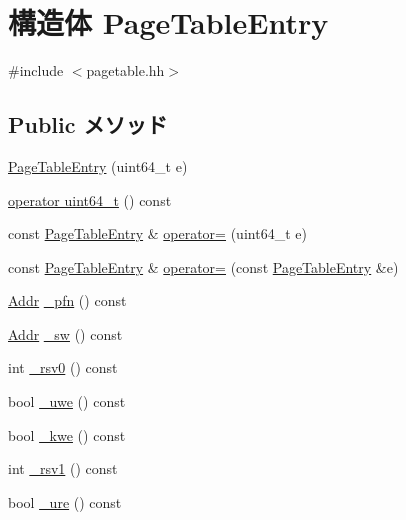 \hypertarget{structAlphaISA_1_1PageTableEntry}{
\section{構造体 PageTableEntry}
\label{structAlphaISA_1_1PageTableEntry}
}


{\ttfamily \#include $<$pagetable.hh$>$}\subsection*{Public メソッド}
\begin{DoxyCompactItemize}
\item 
\hyperlink{structAlphaISA_1_1PageTableEntry_a9b78564edbdf997072d03154bcbe97b6}{PageTableEntry} (uint64\_\-t e)
\item 
\hyperlink{structAlphaISA_1_1PageTableEntry_a6b0df69d39b0e944a8337f52c840be2d}{operator uint64\_\-t} () const 
\item 
const \hyperlink{structAlphaISA_1_1PageTableEntry}{PageTableEntry} \& \hyperlink{structAlphaISA_1_1PageTableEntry_aa0ab0fbd3211d9dbc19476a3f0bb0ab8}{operator=} (uint64\_\-t e)
\item 
const \hyperlink{structAlphaISA_1_1PageTableEntry}{PageTableEntry} \& \hyperlink{structAlphaISA_1_1PageTableEntry_a3dc2db6c9f4ed3f6e9a5b199307a78e0}{operator=} (const \hyperlink{structAlphaISA_1_1PageTableEntry}{PageTableEntry} \&e)
\item 
\hyperlink{classm5_1_1params_1_1Addr}{Addr} \hyperlink{structAlphaISA_1_1PageTableEntry_a5a30d622eca4ff3de1d213cd4f6e5cfd}{\_\-pfn} () const 
\item 
\hyperlink{classm5_1_1params_1_1Addr}{Addr} \hyperlink{structAlphaISA_1_1PageTableEntry_ae0af54e10ca4b07a9afb66b3211d88d2}{\_\-sw} () const 
\item 
int \hyperlink{structAlphaISA_1_1PageTableEntry_a6b35d93b7a6be0c385f9417d53e27266}{\_\-rsv0} () const 
\item 
bool \hyperlink{structAlphaISA_1_1PageTableEntry_a7c7589f98d14a3d99a6f9ef394c378f1}{\_\-uwe} () const 
\item 
bool \hyperlink{structAlphaISA_1_1PageTableEntry_a0be5668cbc16499f2e4c5a25601b418b}{\_\-kwe} () const 
\item 
int \hyperlink{structAlphaISA_1_1PageTableEntry_a830c54fc6920e1b76baf89149950e0a0}{\_\-rsv1} () const 
\item 
bool \hyperlink{structAlphaISA_1_1PageTableEntry_a6c829f9f6ef8d642a3cfee1dbe5d6b07}{\_\-ure} () const 

\end{DoxyCompactItemize}
